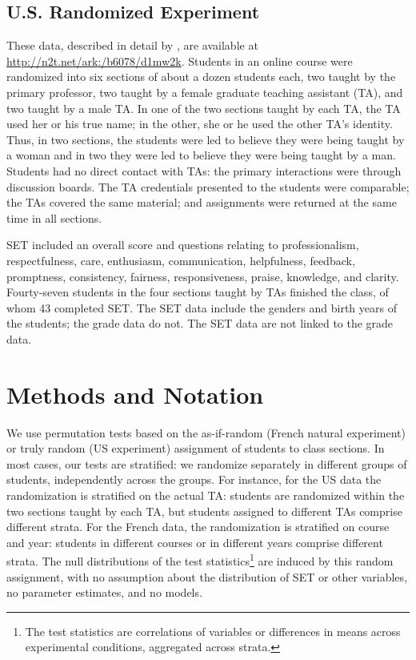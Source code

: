 \documentclass[12pt]{article}
\begin{document}
\subsection{U.S. Randomized Experiment}
These data, described in detail by \cite{MacNell2014}, are available at 
\url{http://n2t.net/ark:/b6078/d1mw2k}.
Students in an online course were randomized into six sections of about a dozen students each, 
two taught by the primary professor,
two taught by a female graduate teaching assistant (TA), and two taught by a male TA.
In one of the two sections taught by each TA, the TA used her or his
true name; in the other, she or he used the other TA's identity.
Thus, in two sections, the students were led to believe they were being taught by a woman
and in two they were led to believe they were being taught by a man.
Students had no direct contact with TAs: the primary interactions were through
discussion boards.
The TA credentials presented to the students were comparable; the TAs covered
the same material; and assignments were returned at the same time in all sections.

SET included an overall score and questions relating to
professionalism, respectfulness, care, enthusiasm, communication, helpfulness,
feedback, promptness, consistency, fairness, responsiveness, praise, knowledge, 
and clarity.
Fourty-seven students in the four sections taught by TAs finished the class,
of whom 43 completed SET.
The SET data include the genders and birth years of the students; the grade data do not.
The SET data are not linked to the grade data.

\section{Methods and Notation} \label{sec:methods}
We use permutation tests based on the as-if-random (French natural experiment)
or truly random (US experiment) assignment of students
to class sections.
In most cases, our tests are stratified: we randomize separately in different
groups of students, independently across the groups.
For instance, for the US data the randomization is stratified on the actual TA:
students are randomized within the two sections taught by each TA,
but students assigned to different TAs comprise different strata.
For the French data, the randomization is stratified on course and year:
students in different courses or in different years comprise different strata.
The null distributions of the test statistics\footnote{%
 The test statistics are correlations of variables or differences in means across experimental
 conditions, aggregated across strata.
}
are induced by this random
assignment, with no assumption about the distribution of SET or other variables, 
no parameter estimates, and no models.
\end{document}
